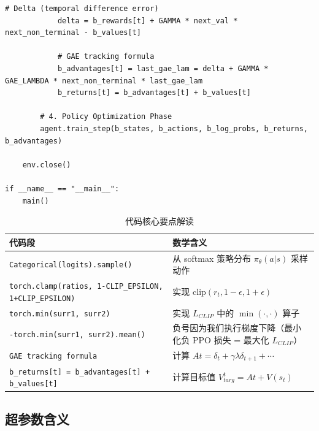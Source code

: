 \documentclass[12pt,a4paper]{article}
\theoremstyle{noteplain}
\theoremstyle{noteexercise}
\begin{document}
\begin{lstlisting}[caption={PPO 算法 PyTorch 实现}, label={lst:ppo}]
            # Delta (temporal difference error)
            delta = b_rewards[t] + GAMMA * next_val * next_non_terminal - b_values[t]
            
            # GAE tracking formula
            b_advantages[t] = last_gae_lam = delta + GAMMA * GAE_LAMBDA * next_non_terminal * last_gae_lam
            b_returns[t] = b_advantages[t] + b_values[t]
            
        # 4. Policy Optimization Phase
        agent.train_step(b_states, b_actions, b_log_probs, b_returns, b_advantages)

    env.close()

if __name__ == "__main__":
    main()
\end{lstlisting}

\begin{table}[H]
  \centering
  \caption{代码核心要点解读}
  \label{tab:code-key}
  \begin{tabular}{>{\centering\arraybackslash}m{5cm}
                 >{\centering\arraybackslash}m{6cm}}
    \toprule
    \textbf{代码段} & \textbf{数学含义} \\
    \midrule
    \lstinline|Categorical(logits).sample()| & 从 softmax 策略分布 $\pi_\theta(a|s)$ 采样动作 \\
    \midrule
    \lstinline|torch.clamp(ratios, 1-CLIP_EPSILON, 1+CLIP_EPSILON)| & 实现 $\text{clip}(r_t, 1-\epsilon, 1+\epsilon)$ \\
    \midrule
    \lstinline|torch.min(surr1, surr2)| & 实现 $L_{CLIP}$ 中的 $\min(\cdot, \cdot)$ 算子 \\
    \midrule
    \lstinline|-torch.min(surr1, surr2).mean()| & 负号因为我们执行梯度下降（最小化负 PPO 损失 = 最大化 $L_{CLIP}$）\\
    \midrule
    \lstinline|GAE tracking formula| & 计算 $A\hat{}t = \delta_t + \gamma\lambda\delta_{t+1} + \cdots$ \\
    \midrule
    \lstinline|b_returns[t] = b_advantages[t] + b_values[t]| & 计算目标值 $V_{targ}^t = A\hat{}t + V(s_t)$ \\
    \bottomrule
  \end{tabular}
\end{table}

\subsection{超参数含义}
\end{document}
